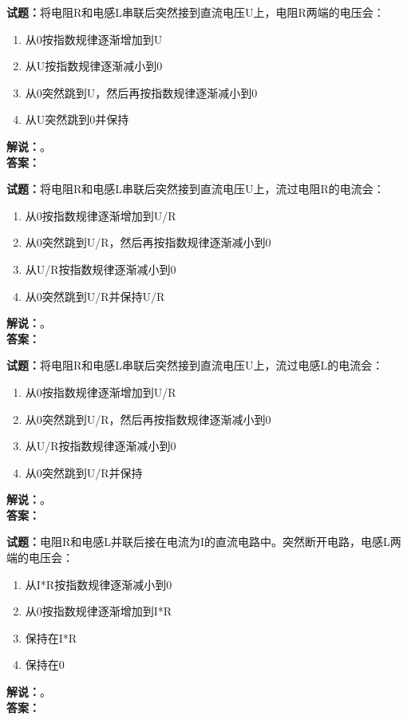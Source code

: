 \documentclass{ctexbook}
\begin{document}
\vspace{\baselineskip}

\noindent\textbf{试题：}将电阻R和电感L串联后突然接到直流电压U上，电阻R两端的电压会：
\begin{enumerate}[leftmargin=3em]
  \item 从0按指数规律逐渐增加到U
  \item 从U按指数规律逐渐减小到0
  \item 从0突然跳到U，然后再按指数规律逐渐减小到0
  \item 从U突然跳到0并保持
\end{enumerate}
\noindent\textbf{解说：}\textbf{}。\\\noindent\textbf{答案：}

\vspace{\baselineskip}

\noindent\textbf{试题：}将电阻R和电感L串联后突然接到直流电压U上，流过电阻R的电流会：
\begin{enumerate}[leftmargin=3em]
  \item 从0按指数规律逐渐增加到U/R
  \item 从0突然跳到U/R，然后再按指数规律逐渐减小到0
  \item 从U/R按指数规律逐渐减小到0
  \item 从0突然跳到U/R并保持U/R
\end{enumerate}
\noindent\textbf{解说：}\textbf{}。\\\noindent\textbf{答案：}

\vspace{\baselineskip}

\noindent\textbf{试题：}将电阻R和电感L串联后突然接到直流电压U上，流过电感L的电流会：
\begin{enumerate}[leftmargin=3em]
  \item 从0按指数规律逐渐增加到U/R
  \item 从0突然跳到U/R，然后再按指数规律逐渐减小到0
  \item 从U/R按指数规律逐渐减小到0
  \item 从0突然跳到U/R并保持
\end{enumerate}
\noindent\textbf{解说：}\textbf{}。\\\noindent\textbf{答案：}

\vspace{\baselineskip}

\noindent\textbf{试题：}电阻R和电感L并联后接在电流为I的直流电路中。突然断开电路，电感L两端的电压会：
\begin{enumerate}[leftmargin=3em]
  \item 从I*R按指数规律逐渐减小到0
  \item 从0按指数规律逐渐增加到I*R
  \item 保持在I*R
  \item 保持在0
\end{enumerate}
\noindent\textbf{解说：}\textbf{}。\\\noindent\textbf{答案：}
\end{document}
